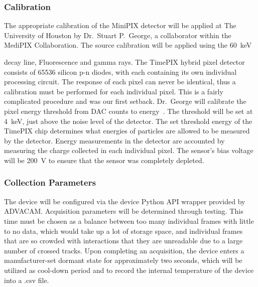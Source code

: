 
\subsubsection{Calibration}   
The appropriate calibration of the MiniPIX detector will be applied at The University of Houston by Dr.~Stuart P.~George, a collaborator within the MediPIX Collaboration. The source calibration will be applied using the \SI{60}{\keV} { decay line,  Fluorescence and  gamma rays. The TimePIX hybrid pixel detector consists of \num{65536} silicon p-n diodes, with each containing its own individual processing circuit. The response of each pixel can never be identical, thus a calibration must be performed for each individual pixel. This is a fairly complicated procedure and was our first setback. Dr.~George will calibrate the pixel energy threshold from DAC counts to energy~\cite{stuartthesis}. The threshold will be set at \SI{4}{\keV}, just above the noise level of the detector. The set threshold energy of the TimePIX chip determines what energies of particles are allowed to be measured by the detector. Energy measurements in the detector are accounted by measuring the charge collected in each individual pixel. The sensor's bias voltage will be \SI{200}{\volt} to ensure that the sensor was completely depleted. 
  
\subsubsection{Collection Parameters}
The device will be configured via the device Python API wrapper provided by ADVACAM. Acquisition parameters will be determined through testing. This time must be chosen as a balance between too many individual frames with little to no data, which would take up a lot of storage space, and individual frames that are so crowded with interactions that they are unreadable due to a large number of crossed tracks. Upon completing an acquisition, the device enters a manufacturer-set dormant state for approximately two seconds, which will be utilized as cool-down period and to record the internal temperature of the device into a .csv file.

}
